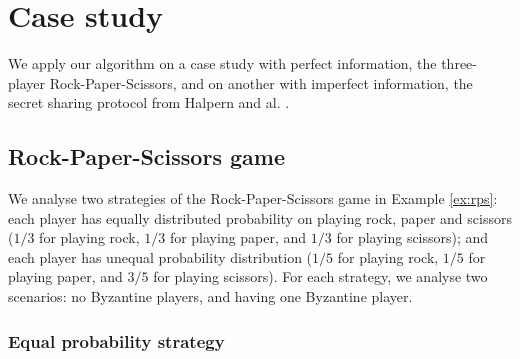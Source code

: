 \section{Case study}\label{sec:casestudy}
We apply our algorithm on a case study with perfect information, the three-player Rock-Paper-Scissors, and on another with imperfect information, the secret sharing protocol from Halpern and al. \cite{ADGH06}.

\subsection{Rock-Paper-Scissors game}

We analyse two strategies of the Rock-Paper-Scissors game in Example \ref{ex:rps}: each player has
equally distributed probability on playing rock, paper and scissors 
($1/3$ for playing rock, $1/3$ for playing paper, and $1/3$ for playing scissors); 
and each player has unequal probability distribution ($1/5$ for playing rock, $1/5$ for playing paper, and $3/5$ for playing scissors). 
For each strategy, we analyse two scenarios: no Byzantine players, and having one Byzantine player. 

\subsubsection{Equal probability strategy}
